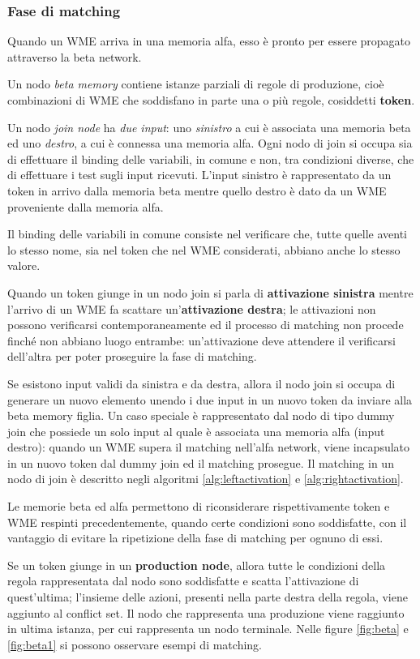 \subsubsection{Fase di matching}
Quando un WME arriva in una memoria alfa, esso è pronto per essere propagato attraverso la beta network.

Un nodo \emph{beta memory} contiene istanze parziali di regole di produzione, cioè combinazioni di WME che soddisfano in parte una o più regole, cosiddetti \textbf{token}.

Un nodo \emph{join node} ha \emph{due input}: uno \emph{sinistro} a cui è associata una memoria beta ed uno \emph{destro}, a cui è connessa una memoria alfa. Ogni nodo di join si occupa sia di effettuare il binding delle variabili, in comune e non, tra condizioni diverse, che di effettuare i test sugli input ricevuti. L'input sinistro è rappresentato da un token in arrivo dalla memoria beta mentre quello destro è dato da un WME proveniente dalla memoria alfa.

Il binding delle variabili in comune consiste nel verificare che, tutte quelle aventi lo stesso nome, sia nel token che nel WME considerati, abbiano anche lo stesso valore.

Quando un token giunge in un nodo join si parla di \textbf{attivazione sinistra} mentre l'arrivo di un WME fa scattare un'\textbf{attivazione destra}; le attivazioni non possono verificarsi contemporaneamente ed il processo di matching non procede finché non abbiano luogo entrambe: un'attivazione deve attendere il verificarsi dell'altra per poter proseguire la fase di matching.

Se esistono input validi da sinistra e da destra, allora il nodo join si occupa di generare un nuovo elemento unendo i due input in un nuovo token da inviare alla beta memory figlia.
Un caso speciale è rappresentato dal nodo di tipo dummy join che possiede un solo input al quale è associata una memoria alfa (input destro): quando un WME supera il matching nell'alfa network, viene incapsulato in un nuovo token dal dummy join ed il matching prosegue. Il matching in un nodo di join è descritto negli algoritmi \ref{alg:leftactivation} e \ref{alg:rightactivation}.

Le memorie beta ed alfa permettono di riconsiderare rispettivamente token e WME respinti precedentemente, quando certe condizioni sono soddisfatte, con il vantaggio di evitare la ripetizione della fase di matching per ognuno di essi.

Se un token giunge in un \textbf{production node}, allora tutte le condizioni della regola rappresentata dal nodo sono soddisfatte e scatta l'attivazione di quest'ultima; l'insieme delle azioni, presenti nella parte destra della regola, viene aggiunto al conflict set. Il nodo che rappresenta una produzione viene  raggiunto in ultima istanza, per cui rappresenta un nodo terminale. Nelle figure \ref{fig:beta} e \ref{fig:beta1} si possono osservare esempi di matching.

